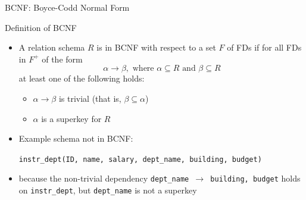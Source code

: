 \documentclass[aspectratio=169, xcolor=dvipsnames]{beamer}
\begin{document}
\begin{frame}{BCNF: Boyce-Codd Normal Form}
    \begin{block}{Definition of BCNF}
        \begin{itemize}[<+->]
            \item A relation schema $R$ is in BCNF with respect to a set $F$ of FDs if for all FDs in $F^+$ of the form
            \[ \alpha \rightarrow \beta, \text{ where } \alpha \subseteq R \text{ and } \beta \subseteq R \]
            at least one of the following holds:
            \begin{itemize}
                \item[$\triangleright$] $\alpha \rightarrow \beta$ is trivial (that is, $\beta \subseteq \alpha$)
                \item[$\triangleright$] $\alpha$ is a superkey for $R$
            \end{itemize}
        \end{itemize}
    \end{block}
    \begin{itemize}[<+(2)->]
        \item Example schema not in BCNF:
        \begin{center}
            \texttt{instr\_dept(ID, name, salary, dept\_name, building, budget)}
        \end{center}
        \item because the non-trivial dependency \texttt{dept\_name $\rightarrow$ building, budget} holds on \texttt{instr\_dept}, but \texttt{dept\_name} is not a superkey
    \end{itemize}
\end{frame}
\end{document}

